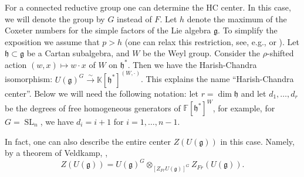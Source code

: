 \documentclass{amsart}
\theoremstyle{definition}
\newcommand{\fh}{\mathfrak{h}}
\newcommand{\lmod}{\on{-mod}}
\newcommand{\sss}{\subsubsection{}}
\newcommand{\on}{\mathrm}
\newcommand{\g}{\mathfrak{g}}
\newcommand{\h}{\mathfrak{h}}
\newcommand{\F}{\mathbb{F}}
\newcommand{\fZ}{\mathfrak{Z}}
\newcommand{\bK}{\mathbb{K}}
\renewcommand{\bK}{\mathbb{K}} %
\numberwithin{equation}{section}
\begin{document}
\sss
For a connected reductive group one can determine the HC center. In this case, we will denote the group by $G$ instead of $F$. Let $h$ denote the maximum of the Coxeter numbers for the simple factors of the Lie algebra $\g$. To simplify the exposition we assume that $p>h$ (one can relax this restriction, see, e.g., \cite[Sec. 6.4]{Jantzen_lectures} or \cite[Sec. 2.2]{Riche_Kostant}). Let $\fh\subset \g$ be a Cartan subalgebra, 
and $W$ be the Weyl group. Consider the $\rho$-shifted action 
$(w,x)\mapsto w\cdot x$ of $W$ on $\fh^*$. Then we have the Harish-Chandra isomorphism: $U(\g)^G\xrightarrow{\sim}\bK[\fh^*]^{(W,\cdot)}$. This explains the name ``Harish-Chandra center''. Below we will need the following notation: let $r=\dim \fh$ and let $d_1,\ldots,d_r$ be the degrees of free homogeneous generators of $\F[\h^*]^W$, for example, for $G=\operatorname{SL}_n$, we have $d_i=i+1$ for $i=1,\ldots,n-1$.

In fact, one can also describe the entire center $Z(U(\g))$ in this case. Namely, by a theorem of Veldkamp, \cite{Veldkamp}, 
$$Z(U(\g))=U(\g)^G\otimes_{[Z_{Fr}U(\g)]^G}Z_{Fr}(U(\g)).$$ 


\end{document}
